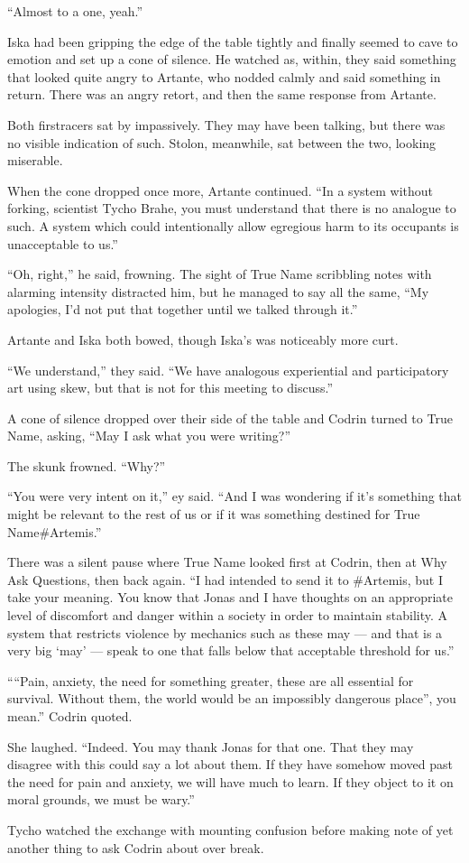 ``Almost to a one, yeah.''

Iska had been gripping the edge of the table tightly and finally seemed to cave to emotion and set up a cone of silence. He watched as, within, they said something that looked quite angry to Artante, who nodded calmly and said something in return. There was an angry retort, and then the same response from Artante.

Both firstracers sat by impassively. They may have been talking, but there was no visible indication of such. Stolon, meanwhile, sat between the two, looking miserable.

When the cone dropped once more, Artante continued. ``In a system without forking, scientist Tycho Brahe, you must understand that there is no analogue to such. A system which could intentionally allow egregious harm to its occupants is unacceptable to us.''

``Oh, right,'' he said, frowning. The sight of True Name scribbling notes with alarming intensity distracted him, but he managed to say all the same, ``My apologies, I'd not put that together until we talked through it.''

Artante and Iska both bowed, though Iska's was noticeably more curt.

``We understand,'' they said. ``We have analogous experiential and participatory art using skew, but that is not for this meeting to discuss.''

A cone of silence dropped over their side of the table and Codrin turned to True Name, asking, ``May I ask what you were writing?''

The skunk frowned. ``Why?''

``You were very intent on it,'' ey said. ``And I was wondering if it's something that might be relevant to the rest of us or if it was something destined for True Name\#Artemis.''

There was a silent pause where True Name looked first at Codrin, then at Why Ask Questions, then back again. ``I had intended to send it to \#Artemis, but I take your meaning. You know that Jonas and I have thoughts on an appropriate level of discomfort and danger within a society in order to maintain stability. A system that restricts violence by mechanics such as these may — and that is a very big `may' — speak to one that falls below that acceptable threshold for us.''

````Pain, anxiety, the need for something greater, these are all essential for survival. Without them, the world would be an impossibly dangerous place'', you mean.'' Codrin quoted.

She laughed. ``Indeed. You may thank Jonas for that one. That they may disagree with this could say a lot about them. If they have somehow moved past the need for pain and anxiety, we will have much to learn. If they object to it on moral grounds, we must be wary.''

Tycho watched the exchange with mounting confusion before making note of yet another thing to ask Codrin about over break.
